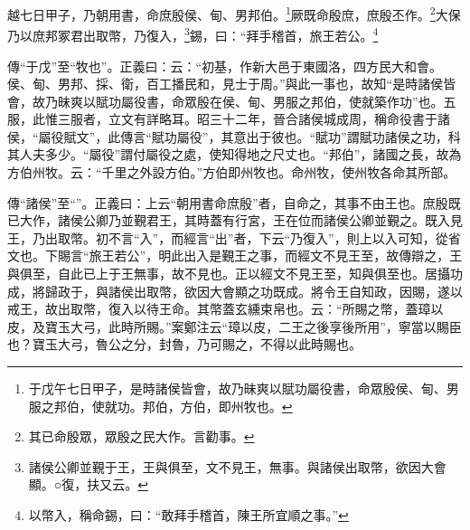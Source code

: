 越七日甲子，乃朝用書，命庶殷侯、甸、男邦伯。\footnote{于戊午七日甲子，是時諸侯皆會，故乃昧爽以賦功屬役書，命眾殷侯、甸、男服之邦伯，使就功。邦伯，方伯，即州牧也。}厥既命殷庶，庶殷丕作。\footnote{其已命殷眾，眾殷之民大作。言勸事。}大保乃以庶邦冢君出取幣，乃復入，\footnote{諸侯公卿並覲于王，王與俱至，文不見王，無事。與諸侯出取幣，欲因大會顯。○復，扶又云。}錫，曰：“拜手稽首，旅王若公。\footnote{以幣入，稱命錫，曰：“敢拜手稽首，陳王所宜順之事。”}

{\noindent\zhuan{}\fzbyks 傳“于戊”至“牧也”。正義曰：云：“初基，作新大邑于東國洛，四方民大和會。侯、甸、男邦、採、衛，百工播民和，見士于周。”與此一事也，故知“是時諸侯皆會，故乃昧爽以賦功屬役書，命眾殷在侯、甸、男服之邦伯，使就築作功”也。五服，此惟三服者，立文有詳略耳。昭三十二年，晉合諸侯城成周，稱命役書于諸侯，“屬役賦文”，此傳言“賦功屬役”，其意出于彼也。“賦功”謂賦功諸侯之功，科其人夫多少。“屬役”謂付屬役之處，使知得地之尺丈也。“邦伯”，諸國之長，故為方伯州牧。云：“千里之外設方伯。”方伯即州牧也。命州牧，使州牧各命其所部。 \par}

{\noindent\zhuan{}\fzbyks 傳“諸侯”至“”。正義曰：上云“朝用書命庶殷”者，自命之，其事不由王也。庶殷既已大作，諸侯公卿乃並覲君王，其時蓋有行宮，王在位而諸侯公卿並覲之。既入見王，乃出取幣。初不言“入”，而經言“出”者，下云“乃復入”，則上以入可知，從省文也。下賜言“旅王若公”，明此出入是覲王之事，而經文不見王至，故傳辯之，王與俱至，自此已上于王無事，故不見也。正以經文不見王至，知與俱至也。居攝功成，將歸政于，與諸侯出取幣，欲因大會顯之功既成。將令王自知政，因賜，遂以戒王，故出取幣，復入以待王命。其幣蓋玄纁束帛也。云：“所賜之幣，蓋璋以皮，及寶玉大弓，此時所賜。”案鄭注云“璋以皮，二王之後享後所用”，寧當以賜臣也？寶玉大弓，魯公之分，封魯，乃可賜之，不得以此時賜也。 \par}

